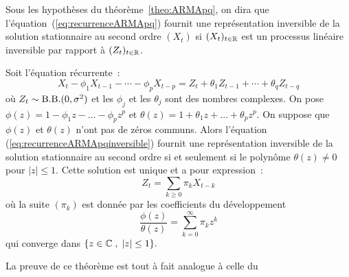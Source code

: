 

\begin{definition}
  Sous les hypoth\`eses du th\'eor\`eme~\ref{theo:ARMApq}, on dira que
  l'\'equation~(\ref{eq:recurrenceARMApq}) fournit une repr\'esentation inversible
  de la solution stationnaire au second ordre $(X_t)$ si $(X_t)_{t\in\mathbb{R}}$
  est un processus lin\'eaire inversible par rapport \`a $(Z_t)_{t\in\mathbb{R}}$.
\end{definition}

\begin{theorem}
 \label{theo:ARMAinversible}
Soit l'\'equation r\'ecurrente~:
\begin{equation}
 \label{eq:recurrenceARMApqinversible}
  X_t - \phi_1 X_{t-1} - \cdots - \phi_p X_{t-p}
  =
  Z_t + \theta_1 Z_{t-1} + \cdots + \theta_q Z_{t-q}
\end{equation} o\`u $Z_t \sim \mathrm{B.B.}(0,\sigma^2)$ et les
$\phi_j$ et les $\theta_j$ sont des nombres complexes. On pose
$\phi(z)= 1 - \phi_1 z - \dots - \phi_p z^p$ et $\theta(z)= 1 +
\theta_1 z + \dots + \theta_p z^p$. On suppose que $\phi(z)$ et
$\theta(z)$ n'ont pas de z\'eros communs. Alors l'\'equation
(\ref{eq:recurrenceARMApqinversible}) fournit une repr\'esentation inversible
de la solution stationnaire au second ordre si et seulement si le polyn\^ome $\theta(z)
\neq 0$ pour $|z| \leq 1$. Cette solution est unique et a pour
expression~:
\begin{equation}
 \label{eq:solutionARMApq_inversible}
  Z_t = \sum_{k\geq 0} \pi_k X_{t-k}
\end{equation}
o\`u la suite $(\pi_k)$ est donn\'ee par les coefficients du d\'eveloppement
$$
\frac{\phi(z)}{\theta(z)}=\sum_{k=0}^{\infty} \pi_k z^k
$$
qui converge dans $\{z\in\mathbb{C}\;,\;|z|\leq 1\}.$
\end{theorem}
La preuve de ce th\'eor\`eme est tout \`a fait analogue \`a celle du
